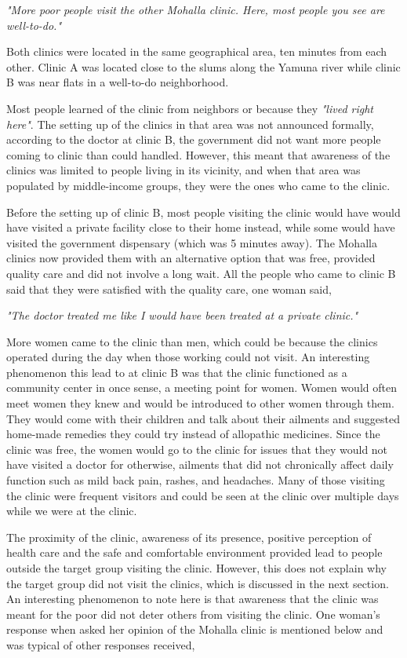 \textit{"More poor people visit the other Mohalla clinic. Here, most people you see are well-to-do."} 

Both clinics were located in the same geographical area, ten minutes from each other. Clinic A was located close to the slums along the Yamuna river while clinic B was near flats in a well-to-do neighborhood. %

Most people learned of the clinic from neighbors or because they \textit{"lived right here"}. The setting up of the clinics in that area was not announced formally, according to the doctor at clinic B, the government did not want more people coming to clinic than could handled. However, this meant that awareness of the clinics was limited to people living in its vicinity, and when that area was populated by middle-income groups, they were the ones who came to the clinic.

Before the setting up of clinic B, most people visiting the clinic would have would have visited a private facility close to their home instead, while some would have visited the government dispensary (which was 5 minutes away). The Mohalla clinics now provided them with an alternative option that was free, provided quality care and did not involve a long wait. All the people who came to clinic B said that they were satisfied with the quality care, one woman said,

\textit{"The doctor treated me like I would have been treated at a private clinic."}

More women came to the clinic than men, which could be because the clinics operated during the day when those working could not visit. An interesting phenomenon this lead to at clinic B was that the clinic functioned as a community center in once sense, a meeting point for women. Women would often meet women they knew and would be introduced to other women through them. They would come with their children and talk about their ailments and suggested home-made remedies they could try instead of allopathic medicines. Since the clinic was free, the women would go to the clinic for issues that they would not have visited a doctor for otherwise, ailments that did not chronically affect daily function such as mild back pain, rashes, and headaches. Many of those visiting the clinic were frequent visitors and could be seen at the clinic over multiple days while we were at the clinic. 

The proximity of the clinic, awareness of its presence, positive perception of health care and the safe and comfortable environment provided lead to people outside the target group visiting the clinic. However, this does not explain why the target group did not visit the clinics, which is discussed in the next section. An interesting phenomenon to note here is that awareness that the clinic was meant for the poor did not deter others from visiting the clinic. One woman's response when asked her opinion of the Mohalla clinic is mentioned below and was typical of other responses received, 

